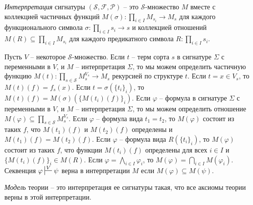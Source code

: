 \documentclass[reqno]{amsart}
\theoremstyle{definition}
\theoremstyle{remark}
\begin{document}
\emph{Интерпретация} сигнатуры $(\mathcal{S},\mathcal{F},\mathcal{P})$ -- это $\mathcal{S}$-множество $M$
вместе с коллекцией частичных функций $M(\sigma) : \prod_{i \in I} M_{s_i} \to M_s$ для каждого функционального символа $\sigma : \prod_{i \in I} s_i \to s$
и коллекцией отношений $M(R) \subseteq \prod_{i \in I} M_{s_i}$ для каждого предикатного символа $R : \prod_{i \in I} s_i$.

Пусть $V$ -- некоторое $\mathcal{S}$-множество.
Если $t$ -- терм сорта $s$ в сигнатуре $\Sigma$ с переменными в $V$, и $M$ -- интерпретация $\Sigma$, то мы можем определить частичную функцию $M(t) : \prod_{s \in \mathcal{S}} M_s^{V_s} \to M_s$ рекурсией по структуре $t$.
Если $t = x \in V_s$, то $M(t)(f) = f_s(x)$.
Если $t = \sigma(\{ t_i \}_i)$, то $M(t)(f) = M(\sigma)(\{ M(t_i)(f) \}_i)$.
Если $\varphi$ -- формула в сигнатуре $\Sigma$ с переменными в $V$, и $M$ -- интерпретация $\Sigma$, то мы можем определить отношение $M(\varphi) \subseteq \prod_{s \in \mathcal{S}} M_s^{V_s}$.
Если $\varphi$ -- формула вида $t_1 = t_2$, то $M(\varphi)$ состоит из таких $f$, что $M(t_1)(f)$ и $M(t_2)(f)$ определены и $M(t_1)(f) = M(t_2)(f)$.
Если $\varphi$ -- формула вида $R(\{ t_i \}_i)$, то $M(\varphi)$ состоит из таких $f$, что функции $M(t_i)(f)$ определены для всех $i \in I$ и $\{ M(t_i)(f) \}_i \in M(R)$.
Если $\varphi = \bigwedge_{i \in I} \varphi_i$, то $M(\varphi) = \bigcap_{i \in I} M(\varphi_i)$.
Секвенция $\varphi \sststile{}{V} \psi$ верна в интерпретации $M$ если $M(\varphi) \subseteq M(\psi)$.

\begin{defn}
\emph{Модель} теории -- это интерпретация ее сигнатуры такая, что все аксиомы теории верны в этой интерпретации.
\end{defn}
\end{document}
